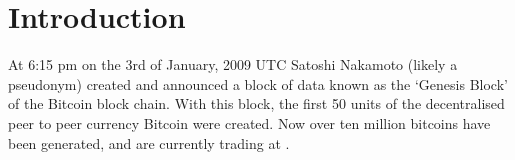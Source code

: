 \section{Introduction}
%
%



% 
% 
% 
% 

At 6:15 pm on the 3rd of January, 2009 UTC Satoshi Nakamoto (likely a pseudonym)
created and announced a block of data known as the `Genesis Block' of the Bitcoin
block chain\cite{satoshi}. With this block, the first 50 units of the
decentralised peer to peer currency Bitcoin were created.  Now over ten million
bitcoins have been generated, and are currently trading at .

